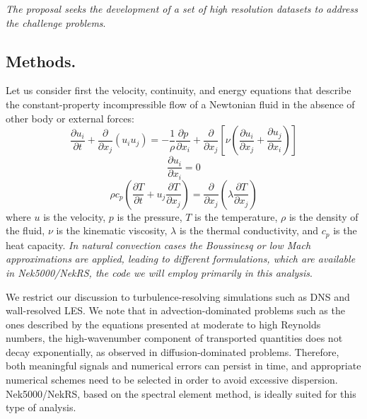 \documentclass[11pt,letterpaper,english]{article}
\begin{document}
\textit{The proposal seeks the development of a set of high resolution datasets to address the challenge problems}.

\vspace{-.25in}
\subsection{Methods.}
\vspace{-.2in}

Let us consider first  the velocity, continuity, and energy equations that describe the constant-property incompressible flow of a Newtonian fluid in the absence of other body or external forces:
\begin{equation}
\frac{\partial  u_i  }{\partial t} +  \frac{\partial}{\partial x_j} \left( u_i u_j \right) =-\frac{1}{\rho} \frac{\partial p}{\partial x_i} + \frac{\partial}{\partial x_j} \left[ \nu \left( \frac{\partial u_i}{\partial x_j} +\frac{\partial u_j}{\partial x_i} \right) \right]
\label{UEqn}
\end{equation}
\begin{equation}
\frac{\partial u_i}{\partial x_i} = 0
\label{rhoEqn}
\end{equation}
\begin{equation}
\rho c_p \left( \frac{\partial T }{\partial t} + u_j \frac{\partial T}{\partial x_j} \right) = \frac{\partial }{\partial x_j} \left( \lambda \frac{\partial T}{\partial x_j} \right)
\label{EEqn}
\end{equation}
where $u$ is the velocity, $p$ is the pressure, $T$ is the temperature, $\rho$ is the  density of the fluid, $\nu$ is the kinematic viscosity, $\lambda$ is the thermal conductivity, and $c_p$ is the heat capacity. \textit{In natural convection cases the Boussinesq or low Mach approximations} \cite{tomboulides1997numerical} \textit{are applied, leading to different formulations, which are available in Nek5000/NekRS, the code we will employ primarily in this analysis}.

We restrict our discussion to turbulence-resolving simulations such as DNS and wall-resolved LES. We note that in advection-dominated problems such as the ones described by the equations presented at moderate to high Reynolds numbers, the high-wavenumber component of transported quantities does not decay exponentially, as observed in diffusion-dominated problems. Therefore, both meaningful signals and numerical errors can persist in time, and appropriate numerical schemes need to be selected in order to avoid excessive dispersion. Nek5000/NekRS, based on the spectral element method, is ideally suited for this type of analysis.
\end{document}
